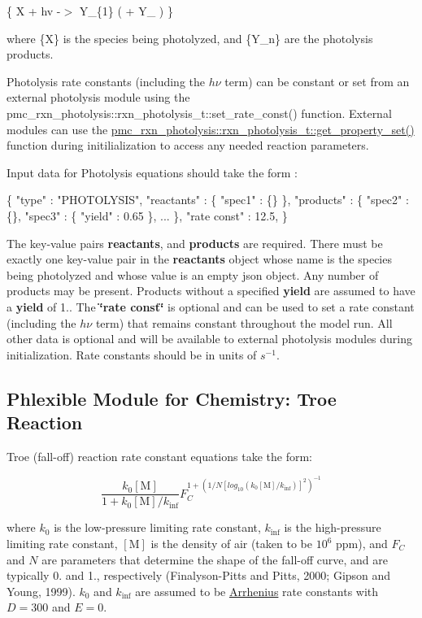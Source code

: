 \{ X + hv -\/$>$ Y\+\_\+\{1\} ( + Y\+\_  ) \}

where \{X\} is the species being photolyzed, and \{Y\+\_\+n\} are the photolysis products.

Photolysis rate constants (including the $h\nu$ term) can be constant or set from an external photolysis module using the {\ttfamily pmc\+\_\+rxn\+\_\+photolysis\+::rxn\+\_\+photolysis\+\_\+t\+::set\+\_\+rate\+\_\+const()} function. External modules can use the {\ttfamily \mbox{\hyperlink{structpmc__rxn__photolysis_1_1rxn__photolysis__t_a4af30a86fec5ca621eae12b191214630}{pmc\+\_\+rxn\+\_\+photolysis\+::rxn\+\_\+photolysis\+\_\+t\+::get\+\_\+property\+\_\+set()}}} function during initilialization to access any needed reaction parameters.

Input data for Photolysis equations should take the form \+: 
\begin{DoxyCode}
\{
  "type" : "PHOTOLYSIS",
  "reactants" : \{
    "spec1" : \{\}
  \},
  "products" : \{
    "spec2" : \{\},
    "spec3" : \{ "yield" : 0.65 \},
    ...
  \},
  "rate const" : 12.5,
\}
\end{DoxyCode}
 The key-\/value pairs {\bfseries reactants}, and {\bfseries products} are required. There must be exactly one key-\/value pair in the {\bfseries reactants} object whose name is the species being photolyzed and whose value is an empty {\ttfamily json} object. Any number of products may be present. Products without a specified {\bfseries yield} are assumed to have a {\bfseries yield} of 1.. The {\bfseries \char`\"{}rate const\char`\"{}} is optional and can be used to set a rate constant (including the $h\nu$ term) that remains constant throughout the model run. All other data is optional and will be available to external photolysis modules during initialization. Rate constants should be in units of $s^{-1}$. \hypertarget{phlex_rxn_troe}{}\subsection{Phlexible Module for Chemistry\+: Troe Reaction}\label{phlex_rxn_troe}
Troe (fall-\/off) reaction rate constant equations take the form\+:

\[ \frac{k_0[\mbox{M}]}{1+k_0[\mbox{M}]/k_{\inf}}F_C^{1+(1/N[log_{10}(k_0[\mbox{M}]/k_{\inf})]^2)^{-1}} \]

where $k_0$ is the low-\/pressure limiting rate constant, $k_{\inf}$ is the high-\/pressure limiting rate constant, $[\mbox{M}]$ is the density of air (taken to be $10^6$ ppm), and $F_C$ and $N$ are parameters that determine the shape of the fall-\/off curve, and are typically 0. and 1., respectively (Finalyson-\/\+Pitts and Pitts, 2000; Gipson and Young, 1999). $k_0$ and $k_{\inf}$ are assumed to be \mbox{\hyperlink{phlex_rxn_arrhenius}{Arrhenius}} rate constants with $D=300$ and $E=0$.

